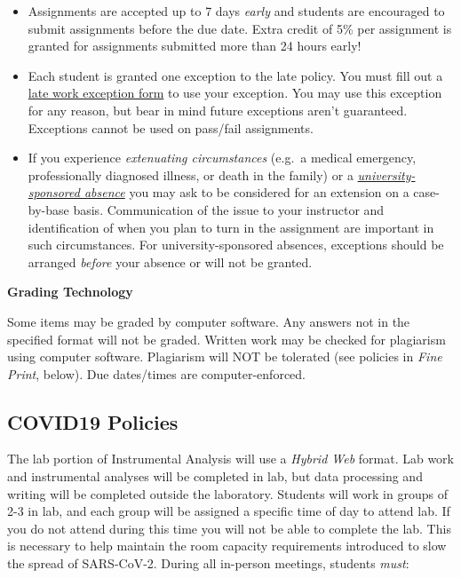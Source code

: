 \documentclass[]{tufte-book}
\providecommand{\tightlist}{%
  \setlength{\itemsep}{0pt}\setlength{\parskip}{0pt}}
\begin{document}
\begin{itemize}
\tightlist
\item
  Assignments are accepted up to 7 days \emph{early} and students are encouraged to submit assignments before the due date. Extra credit of 5\% per assignment is granted for assignments submitted more than 24 hours early!
\item
  Each student is granted one exception to the late policy. You must fill out a \href{https://forms.office.com/Pages/ResponsePage.aspx?id=WluzxdUWFESO4XvecFQ_GwFnoMNxJhxDhln9pQs53sVUOEMxSk9IWThGUExPNEEzTTlONTJXR1dSNS4u}{late work exception form} to use your exception. You may use this exception for any reason, but bear in mind future exceptions aren't guaranteed. Exceptions cannot be used on pass/fail assignments.
\item
  If you experience \emph{extenuating circumstances} (e.g.~a medical emergency, professionally diagnosed illness, or death in the family) or a \href{https://www.wcu.edu/experience/health-and-wellness/student-concern-response-team/absence-notification-protocol.aspx}{\emph{university-sponsored absence}} you may ask to be considered for an extension on a case-by-base basis. Communication of the issue to your instructor and identification of when you plan to turn in the assignment are important in such circumstances. For university-sponsored absences, exceptions should be arranged \emph{before} your absence or will not be granted.
\end{itemize}

\textbf{Grading Technology}

Some items may be graded by computer software. Any answers not in the specified format will not be graded. Written work may be checked for plagiarism using computer software. Plagiarism will NOT be tolerated (see policies in \emph{Fine Print}, below). Due dates/times are computer-enforced.

\hypertarget{covid19-policies}{%
\subsection*{COVID19 Policies}\label{covid19-policies}}

The lab portion of Instrumental Analysis will use a \emph{Hybrid Web} format. Lab work and instrumental analyses will be completed in lab, but data processing and writing will be completed outside the laboratory. Students will work in groups of 2-3 in lab, and each group will be assigned a specific time of day to attend lab. If you do not attend during this time you will not be able to complete the lab. This is necessary to help maintain the room capacity requirements introduced to slow the spread of SARS-CoV-2. During all in-person meetings, students \emph{must}:
\end{document}
